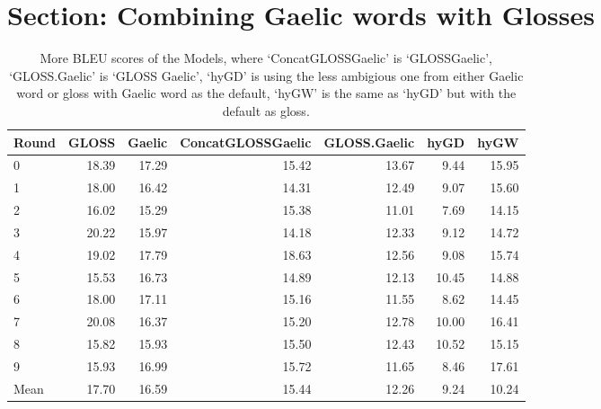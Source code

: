 \documentclass[a4paper]{article}
\begin{document}
\section{Section: Combining Gaelic words with Glosses }\label{gd_plus_gl_to_en}

\begin{table}[ht]
\centering
\begin{tabular}{lrrrrrr}
  \hline
Round & GLOSS & Gaelic & ConcatGLOSSGaelic & GLOSS.Gaelic & hyGD & hyGW \\ 
  \hline
0 & 18.39 & 17.29 & 15.42 & 13.67 & 9.44 & 15.95 \\ 
  1 & 18.00 & 16.42 & 14.31 & 12.49 & 9.07 & 15.60 \\ 
  2 & 16.02 & 15.29 & 15.38 & 11.01 & 7.69 & 14.15 \\ 
  3 & 20.22 & 15.97 & 14.18 & 12.33 & 9.12 & 14.72 \\ 
  4 & 19.02 & 17.79 & 18.63 & 12.56 & 9.08 & 15.74 \\ 
  5 & 15.53 & 16.73 & 14.89 & 12.13 & 10.45 & 14.88 \\ 
  6 & 18.00 & 17.11 & 15.16 & 11.55 & 8.62 & 14.45 \\ 
  7 & 20.08 & 16.37 & 15.20 & 12.78 & 10.00 & 16.41 \\ 
  8 & 15.82 & 15.93 & 15.50 & 12.43 & 10.52 & 15.15 \\ 
  9 & 15.93 & 16.99 & 15.72 & 11.65 & 8.46 & 17.61 \\ 
   \hline
Mean & 17.70 & 16.59 & 15.44 & 12.26 & 9.24 & 10.24 \\ 
   \hline
\end{tabular}
\caption{More BLEU scores of the Models, where `ConcatGLOSSGaelic' is `GLOSS\textunderscore Gaelic', `GLOSS.Gaelic' is `GLOSS Gaelic', `hyGD' is using the less ambigious one from either Gaelic word or gloss with Gaelic word as the default, `hyGW' is the same as `hyGD' but with the default as gloss.} 
\label{Table:BLEUGlossGDALL}
\end{table}%
\end{document}
